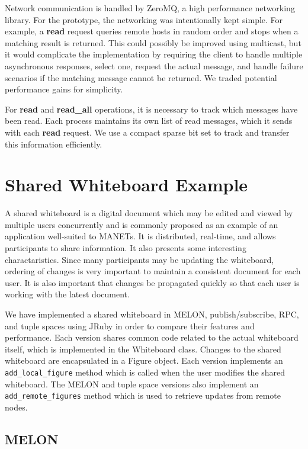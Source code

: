 \documentclass{llncs}
\begin{document}
Network communication is handled by ZeroMQ\cite{hintjens2013zeromq}, a high performance networking library. For the prototype, the networking was intentionally kept simple. For example, a \textbf{read} request queries remote hosts in random order and stops when a matching result is returned. This could possibly be improved using multicast, but it would complicate the implementation by requiring the client to handle multiple asynchronous responses, select one, request the actual message, and handle failure scenarios if the matching message cannot be returned. We traded potential performance gains for simplicity. 

For \textbf{read} and \textbf{read\_all} operations, it is necessary to track which messages have been read. Each process maintains its own list of read messages, which it sends with each \textbf{read} request. We use a compact sparse bit set to track and transfer this information efficiently.

\section{Shared Whiteboard Example}\label{sec:wb}

A shared whiteboard is a digital document which may be edited and viewed by multiple users concurrently and is commonly proposed as an example of an application well-suited to MANETs. It is distributed, real-time, and allows participants to share information. It also presents some interesting charactaristics. Since many participants may be updating the whiteboard, ordering of changes is very important to maintain a consistent document for each user. It is also important that changes be propagated quickly so that each user is working with the latest document.

We have implemented a shared whiteboard in MELON, publish/subscribe, RPC, and tuple spaces using JRuby in order to compare their features and performance.
Each version shares common code related to the actual whiteboard itself, which is implemented in the Whiteboard class.
Changes to the shared whiteboard are encapsulated in a Figure object. Each version implements an \texttt{add\_local\_figure} method which is called when the user modifies the shared whiteboard.
The MELON and tuple space versions also implement an \texttt{add\_remote\_figures} method which is used to retrieve updates from remote nodes.


\subsection{MELON}
\end{document}
